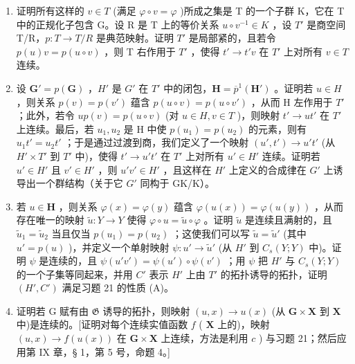 \begin{enumerate}
\def\labelenumi{\alph{enumi})}
\item
  证明所有这样的 \(v \in T\) (满足 \(\varphi \circ v = \varphi\) )所成之集是 T 的一个子群 K，它在 T 中的正规化子包含 G。设 R 是 T 上的等价关系 \(u \circ v^{-1} \in K\) ，设 \(T'\) 是商空间 T/R，\(p: T \to T/R\) 是典范映射。证明 \(T'\) 是局部紧的，且若令 \(p(u)v = p(u \circ v)\) ，则 T 右作用于 \(T'\) ，使得 \(t' \to t'v\) 在 \(T'\) 上对所有 \(v \in T\) 连续。
\item
  设 \(\mathbf{G}' = p(\mathbf{G})\) ，\(H'\) 是 \(G'\) 在 \(T'\) 中的闭包，\(\mathbf{H} = \overline{p}^{1}(\mathbf{H}')\) 。证明若 \(u \in H\) ，则关系 \(p(v) = p(v')\) 蕴含 \(p(u \circ v) = p(u \circ v')\) ，从而 H 左作用于 \(T'\) ；此外，若令 \(up(v) = p(u \circ v)\) (对 \(u \in H, v \in T\) )，则映射 \(t' \to ut'\) 在 \(T'\) 上连续。最后，若 \(u_1, u_2\) 是 H 中使 \(p(u_1) = p(u_2)\) 的元素，则有 \(u_1t' = u_2t'\) ；于是通过过渡到商，我们定义了一个映射 \((u', t') \to u't'\) (从 \(H' \times T'\) 到 \(T'\) 中)，使得 \(t' \to u't'\) 在 \(T'\) 上对所有 \(u' \in H'\) 连续。证明若 \(u' \in H'\) 且 \(v' \in H'\) ，则 \(u'v' \in H'\) ，且这样在 \(H'\) 上定义的合成律在 \(G'\) 上诱导出一个群结构（关于它 \(G'\) 同构于 GK/K）。
\item
  若 \(u \in \mathbf{H}\) ，则关系 \(\varphi(x) = \varphi(y)\) 蕴含 \(\varphi(u(x)) = \varphi(u(y))\) ，从而存在唯一的映射 \(\tilde{u}: Y \to Y\) 使得 \(\varphi \circ u = \tilde{u} \circ \varphi\) 。证明 \(\tilde{u}\) 是连续且满射的，且 \(\tilde{u}_1 = \tilde{u}_2\) 当且仅当 \(p(u_1) = p(u_2)\) ；这使我们可以写 \(\tilde{u} = \tilde{u}'\) (其中 \(u' = p(u)\) )，并定义一个单射映射 \(\psi: u' \to \tilde{u}'\) (从 \(H'\) 到 \(C_s(Y; Y)\) 中)。证明 \(\psi\) 是连续的，且 \(\psi(u'v') = \psi(u') \circ \psi(v')\) ；用 \(\psi\) 把 \(H'\) 与 \(C_s(Y; Y)\) 的一个子集等同起来，并用 \(C'\) 表示 \(H'\) 上由 \(T'\) 的拓扑诱导的拓扑，证明 \((H', C')\) 满足习题 21 的性质 (A)。
\item
  证明若 G 赋有由 \(\mathfrak{G}\) 诱导的拓扑，则映射 \((u, x) \to u(x)\) (从 \(\mathbf{G} \times \mathbf{X}\) 到 \(\mathbf{X}\) 中)是连续的。{[}证明对每个连续实值函数 \(f\) ( \(\mathbf{X}\) 上的)，映射 \((u, x) \to f(u(x))\) 在 \(\mathbf{G} \times \mathbf{X}\) 上连续，方法是利用 \(c\) ) 与习题 21；然后应用第 IX 章，§ 1，第 5 号，命题 4。{]}
\end{enumerate}

